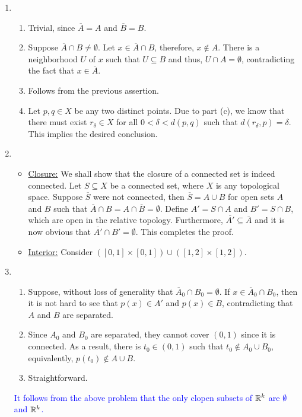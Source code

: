 \begin{enumerate}
\item 
\begin{enumerate}
    \item Trivial, since $\overline{A} = A$ and $\overline{B} = B$.
    \item Suppose $\overline{A}\cap B\ne\emptyset$. Let $x\in\overline{A}\cap B$, therefore, $x\notin A$. There is a neighborhood $U$ of $x$ such that $U\subseteq B$ and thus, $U\cap A = \emptyset$, contradicting the fact that $x\in\overline{A}$.
    \item Follows from the previous assertion.
    \item Let $p,q\in X$ be any two distinct points. Due to part (c), we know that there must exist $r_\delta\in X$ for all $0 < \delta < d(p,q)$ such that $d(r_\delta, p) = \delta$. This implies the desired conclusion.
\end{enumerate}

\item 
\begin{itemize}
    \item \underline{Closure:} We shall show that the closure of a connected set is indeed connected. Let $S\subseteq X$ be a connected set, where $X$ is any topological space. Suppose $\overline{S}$ were not connected, then $\overline{S} = A\cup B$ for open sets $A$ and $B$ such that $\overline{A}\cap B = A\cap\overline{B} = \emptyset$. Define $A' = S\cap A$ and $B' = S\cap B$, which are open in the relative topology. Furthermore, $\overline{A'}\subseteq\overline{A}$ and it is now obvious that $\overline{A'}\cap B' = \emptyset$. This completes the proof.
    \item \underline{Interior:} Consider $([0,1]\times[0,1])\cup([1,2]\times[1,2])$.
\end{itemize}

\item 
\begin{enumerate}
    \item Suppose, without loss of generality that $\overline{A}_0\cap B_0 = \emptyset$. If $x\in\overline{A}_0\cap B_0$, then it is not hard to see that $p(x)\in A'$ and $p(x)\in B$, contradicting that $A$ and $B$ are separated.

    \item Since $A_0$ and $B_0$ are separated, they cannot cover $(0,1)$ since it is connected. As a result, there is $t_0\in (0,1)$ such that $t_0\notin A_0\cup B_0$, equivalently, $p(t_0)\notin A\cup B$.

    \item Straightforward.
\end{enumerate}
\textcolor{blue}{It follows from the above problem that the only clopen subsets of $\mathbb{R}^k$ are $\emptyset$ and $\mathbb{R}^k$.}


\end{enumerate}
